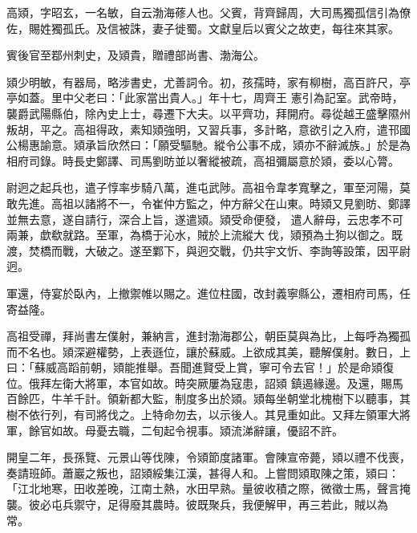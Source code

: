 
\begin{pinyinscope}

 高熲，字昭玄，一名敏，自云渤海蓚人也。父賓，背齊歸周，大司馬獨孤信引為僚佐，賜姓獨孤氏。及信被誅，妻子徙蜀。文獻皇后以賓父之故吏，每往來其家。



 賓後官至鄀州刺史，及熲貴，贈禮部尚書、渤海公。



 熲少明敏，有器局，略涉書史，尤善詞令。初，孩孺時，家有柳樹，高百許尺，亭亭如蓋。里中父老曰：「此家當出貴人。」年十七，周齊王
 憲引為記室。武帝時，襲爵武陽縣伯，除內史上士，尋遷下大夫。以平齊功，拜開府。尋從越王盛擊隰州叛胡，平之。高祖得政，素知熲強明，又習兵事，多計略，意欲引之入府，遣邗國公楊惠諭意。熲承旨欣然曰：「願受驅馳。縱令公事不成，熲亦不辭滅族。」於是為相府司錄。時長史鄭譯、司馬劉昉並以奢縱被疏，高祖彌屬意於熲，委以心膂。



 尉迥之起兵也，遣子惇率步騎八萬，進屯武陟。高祖令韋孝寬擊之，軍至河陽，莫敢先進。高祖以諸將不一，令崔仲方監之，仲方辭父在山東。時熲又見劉昉、鄭譯並無去意，遂自請行，深合上旨，遂遣熲。熲受命便發，
 遣人辭母，云忠孝不可兩兼，歔欷就路。至軍，為橋于沁水，賊於上流縱大伐，熲預為土狗以御之。既渡，焚橋而戰，大破之。遂至鄴下，與迥交戰，仍共宇文忻、李詢等設策，因平尉迥。



 軍還，侍宴於臥內，上撤禦帷以賜之。進位柱國，改封義寧縣公，遷相府司馬，任寄益隆。



 高祖受禪，拜尚書左僕射，兼納言，進封渤海郡公，朝臣莫與為比，上每呼為獨孤而不名也。熲深避權勢，上表遜位，讓於蘇威。上欲成其美，聽解僕射。數日，上曰：「蘇威高蹈前朝，熲能推舉。吾聞進賢受上賞，寧可令去官！」於是命熲復位。俄拜左衛大將軍，本官如故。時突厥屢為寇患，詔熲
 鎮遏緣邊。及還，賜馬百餘匹，牛羊千計。領新都大監，制度多出於熲。熲每坐朝堂北槐樹下以聽事，其樹不依行列，有司將伐之。上特命勿去，以示後人。其見重如此。又拜左領軍大將軍，餘官如故。母憂去職，二旬起令視事。熲流涕辭讓，優詔不許。



 開皇二年，長孫覽、元景山等伐陳，令熲節度諸軍。會陳宣帝薨，熲以禮不伐喪，奏請班師。蕭巖之叛也，詔熲綏集江漢，甚得人和。上嘗問熲取陳之策，熲曰：「江北地寒，田收差晚，江南土熱，水田早熟。量彼收積之際，微徵士馬，聲言掩襲。彼必屯兵禦守，足得廢其農時。彼既聚兵，我便解甲，再三若此，賊以為
 常。




\end{pinyinscope}
